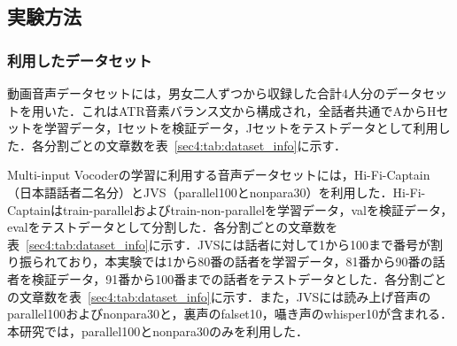 \documentclass[12pt]{jarticle}
\numberwithin{equation}{section}    %
\numberwithin{figure}{section}      %
\numberwithin{table}{section}      %
\begin{document}

\subsection{実験方法}
\subsubsection{利用したデータセット}
動画音声データセットには，男女二人ずつから収録した合計4人分のデータセット\cite{taguchi,esaki}を用いた．これはATR音素バランス文\cite{atr}から構成され，全話者共通でAからHセットを学習データ，Iセットを検証データ，Jセットをテストデータとして利用した．各分割ごとの文章数を表~\ref{sec4:tab:dataset_info}に示す．

Multi-input Vocoderの学習に利用する音声データセットには，Hi-Fi-Captain（日本語話者二名分）\cite{okamoto2023hi}とJVS（parallel100とnonpara30）\cite{takamichi2019jvs}を利用した．Hi-Fi-Captainはtrain-parallelおよびtrain-non-parallelを学習データ，valを検証データ，evalをテストデータとして分割した．各分割ごとの文章数を表~\ref{sec4:tab:dataset_info}に示す．JVSには話者に対して1から100まで番号が割り振られており，本実験では1から80番の話者を学習データ，81番から90番の話者を検証データ，91番から100番までの話者をテストデータとした．各分割ごとの文章数を表~\ref{sec4:tab:dataset_info}に示す．また，JVSには読み上げ音声のparallel100およびnonpara30と，裏声のfalset10，囁き声のwhisper10が含まれる．本研究では，parallel100とnonpara30のみを利用した．
\end{document}
